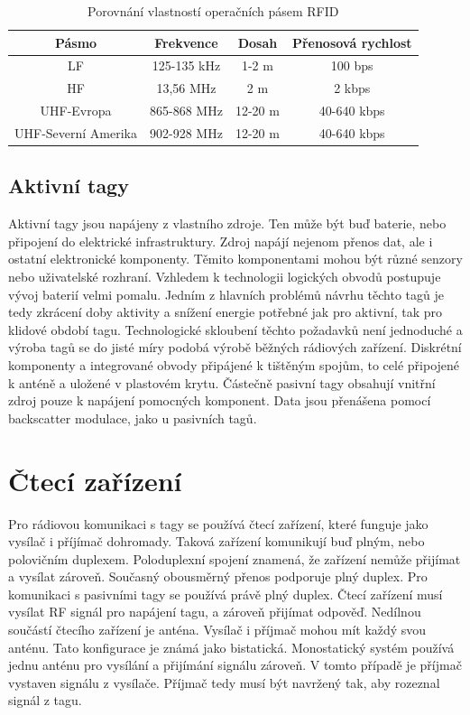\begin{table}[]
\begin{tabular}{cccc}
\hline
Pásmo               & Frekvence   & Dosah   & Přenosová rychlost \\ \hline
LF                  & 125-135 kHz & 1-2 m   & 100 bps            \\
HF                  & 13,56 MHz   & 2 m     & 2 kbps             \\
UHF-Evropa          & 865-868 MHz & 12-20 m & 40-640 kbps        \\
UHF-Severní Amerika & 902-928 MHz & 12-20 m & 40-640 kbps        \\ \hline
\end{tabular}
\caption{Porovnání vlastností operačních pásem RFID\cite{RFID_explained}\cite{The_RF_in_RFID}}
\label{tabulka_pasem}
\end{table}

\subsection{Aktivní tagy} %
Aktivní tagy jsou napájeny z vlastního zdroje. Ten může být buď baterie, nebo připojení do elektrické infrastruktury. Zdroj napájí nejenom přenos dat, ale i ostatní elektronické komponenty. Těmito komponentami mohou být různé senzory nebo uživatelské rozhraní\cite{RFID_explained}. Vzhledem k technologii logických obvodů postupuje vývoj baterií velmi pomalu. Jedním z hlavních problémů návrhu těchto tagů je tedy zkrácení doby aktivity a snížení energie potřebné jak pro aktivní, tak pro klidové období tagu. Technologické skloubení těchto požadavků není jednoduché a výroba tagů se do jisté míry podobá výrobě běžných rádiových zařízení. Diskrétní komponenty a integrované obvody připájené k tištěným spojům, to celé připojené k anténě a uložené v plastovém krytu\cite{The_RF_in_RFID}. 
Částečně pasivní tagy obsahují vnitřní zdroj pouze k napájení pomocných komponent. Data jsou přenášena pomocí backscatter modulace, jako u pasivních tagů\cite{Survey_of_RFID_Tags}.


\section{Čtecí zařízení}
Pro rádiovou komunikaci s tagy se používá čtecí zařízení, které funguje jako vysílač i příjímač dohromady. Taková zařízení komunikují buď plným, nebo polovičním duplexem. Poloduplexní spojení znamená, že zařízení nemůže přijímat a vysílat zároveň. Současný obousměrný přenos podporuje plný duplex. Pro komunikaci s pasivními tagy se používá právě plný duplex. Čtecí zařízení musí vysílat RF signál pro napájení tagu, a zároveň přijímat odpověď.
Nedílnou součástí čtecího zařízení je anténa. Vysílač i příjmač mohou mít každý svou anténu. Tato konfigurace je známá jako bistatická. Monostatický systém používá jednu anténu pro vysílání a přijímání signálu zároveň. V tomto případě je příjmač vystaven signálu z vysílače. Příjmač tedy musí být navržený tak, aby rozeznal signál z tagu\cite{The_RF_in_RFID}.\par

